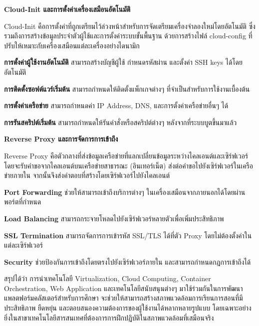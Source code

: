\hspace*{1.5em} %
\textbf{Cloud-Init และการตั้งค่าเครื่องเสมือนอัตโนมัติ}

\hspace*{1.5em} %
Cloud-Init คือการตั้งค่าที่ถูกเตรียมไว้ล่วงหน้าสำหรับการจัดเตรียมเครื่องจำลองใหม่โดยอัตโนมัติ ซึ่งรวมถึงการสร้างข้อมูลประจำตัวผู้ใช้และการตั้งค่าระบบขั้นพื้นฐาน ด้วยการสร้างไฟล์ cloud-config ที่ปรับให้เหมาะกับเครื่องเสมือนแต่ละเครื่องอย่างไดนามิก

\begin{mycustomitem}
    \item \textbf{การตั้งค่าผู้ใช้งานอัตโนมัติ} สามารถสร้างบัญชีผู้ใช้ กำหนดรหัสผ่าน และตั้งค่า SSH keys ได้โดยอัตโนมัติ
    \item \textbf{การติดตั้งซอฟต์แวร์เริ่มต้น} สามารถกำหนดให้ติดตั้งแพ็กเกจต่างๆ ที่จำเป็นสำหรับการใช้งานเบื้องต้น
    \item \textbf{การตั้งค่าเครือข่าย} สามารถกำหนดค่า IP Address, DNS, และการตั้งค่าเครือข่ายอื่นๆ ได้
    \item \textbf{การรันสคริปต์เริ่มต้น} สามารถกำหนดให้รันคำสั่งหรือสคริปต์ต่างๆ หลังจากที่ระบบบูตขึ้นมาแล้ว
\end{mycustomitem}

\hspace*{1.5em} %
\textbf{Reverse Proxy และการจัดการการเข้าถึง}

\hspace*{1.5em} %
Reverse Proxy คือตัวกลางที่ส่งข้อมูลเครือข่ายที่แลกเปลี่ยนข้อมูลระหว่างไคลเอนต์และเซิร์ฟเวอร์ โดยจะรับคำขอจากไคลเอนต์บนเครือข่ายสาธารณะ (อินเทอร์เน็ต) ส่งต่อคำขอไปยังเซิร์ฟเวอร์ในเครือข่ายภายใน จากนั้นจึงส่งคำตอบที่สร้างโดยเซิร์ฟเวอร์ไปยังไคลเอนต์

\begin{mycustomitem}
    \item \textbf{Port Forwarding} ช่วยให้สามารถเข้าถึงบริการต่างๆ ในเครื่องเสมือนจากภายนอกได้โดยผ่านพอร์ตที่กำหนด
    \item \textbf{Load Balancing} สามารถกระจายโหลดไปยังเซิร์ฟเวอร์หลายตัวเพื่อเพิ่มประสิทธิภาพ
    \item \textbf{SSL Termination} สามารถจัดการการเข้ารหัส SSL/TLS ได้ที่ตัว Proxy โดยไม่ต้องตั้งค่าในแต่ละเซิร์ฟเวอร์
    \item \textbf{Security} ช่วยป้องกันการเข้าถึงโดยตรงไปยังเซิร์ฟเวอร์ภายใน และสามารถกำหนดกฎการเข้าถึงได้
\end{mycustomitem}

\hspace*{1.5em} %
สรุปได้ว่า การนำเทคโนโลยี Virtualization, Cloud Computing, Container Orchestration, Web Application และเทคโนโลยีสนับสนุนต่างๆ มาใช้ร่วมกันในการพัฒนาแพลตฟอร์มคลัสเตอร์สำหรับการศึกษา จะช่วยให้สามารถสร้างสภาพแวดล้อมการเรียนการสอนที่มีประสิทธิภาพ ยืดหยุ่น และตอบสนองความต้องการของผู้ใช้งานได้หลากหลายรูปแบบ โดยเฉพาะอย่างยิ่งในสาขาเทคโนโลยีสารสนเทศที่ต้องการการฝึกปฏิบัติในสภาพแวดล้อมที่เสมือนจริง


